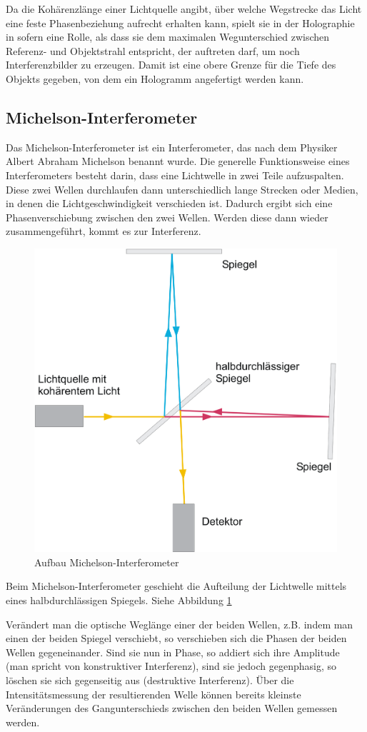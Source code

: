 \documentclass[12pt]{article}
\begin{document}
Da die Kohärenzlänge einer Lichtquelle angibt, über welche Wegstrecke das Licht eine feste
Phasenbeziehung aufrecht erhalten kann, spielt sie in der Holographie in sofern eine Rolle, als
dass sie dem maximalen Wegunterschied zwischen Referenz- und Objektstrahl entspricht, der
auftreten darf, um noch Interferenzbilder zu erzeugen. Damit ist eine obere Grenze für die Tiefe
des Objekts gegeben, von dem ein Hologramm angefertigt werden kann.

\subsection{Michelson-Interferometer}
Das Michelson-Interferometer ist ein Interferometer, das nach dem Physiker Albert Abraham Michelson benannt wurde. 
Die generelle Funktionsweise eines Interferometers besteht darin, dass eine Lichtwelle in zwei Teile aufzuspalten. Diese zwei Wellen durchlaufen dann
unterschiedlich lange Strecken oder Medien, in denen die Lichtgeschwindigkeit verschieden ist. Dadurch ergibt sich eine Phasenverschiebung zwischen den
zwei Wellen. Werden diese dann wieder zusammengeführt, kommt es zur Interferenz.
\begin{figure}[h]
 \includegraphics[width=0.5\linewidth]{pictures/michelson.eps}
 \caption{Aufbau Michelson-Interferometer}
 \label{michelson}
\end{figure}
Beim Michelson-Interferometer geschieht die Aufteilung der Lichtwelle mittels eines halbdurchlässigen Spiegels. Siehe Abbildung \ref{michelson}

Verändert man die optische Weglänge einer der beiden Wellen, z.B. indem man einen der beiden Spiegel verschiebt, so verschieben sich die Phasen der beiden
Wellen gegeneinander. Sind sie nun in Phase, so addiert sich ihre Amplitude (man spricht von konstruktiver Interferenz), sind sie jedoch gegenphasig, so
löschen sie sich gegenseitig aus (destruktive Interferenz). Über die Intensitätsmessung der resultierenden Welle können bereits kleinste Veränderungen des
Gangunterschieds zwischen den beiden Wellen gemessen werden.
\end{document}
